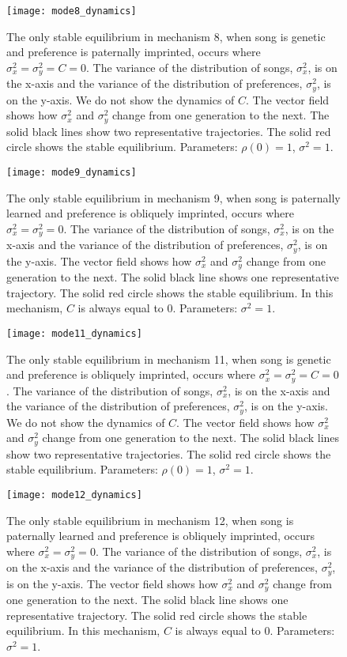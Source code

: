 \documentclass{article}
\begin{document}
\begin{figure}
\texttt{[image: mode8\_dynamics]}
\caption{\label{mode8} The only stable equilibrium in mechanism 8, when song is genetic and preference is paternally imprinted,  occurs where $\sigma_x^2=\sigma_y^2=C=0$. The variance of the distribution of songs, $\sigma_x^2$, is on the x-axis and the variance of the distribution of preferences, $\sigma_y^2$, is on the y-axis. We do not show the dynamics of $C$. The vector field shows how $\sigma_x^2$ and $\sigma_y^2$ change from one generation to the next. The solid black lines show two representative trajectories. The solid red circle shows the stable equilibrium. Parameters: $\rho(0)=1$, $\sigma^2=1$.}
\end{figure}

\begin{figure}
\texttt{[image: mode9\_dynamics]}
\caption{\label{mode9} The only stable equilibrium in mechanism 9, when song is paternally learned and preference is obliquely imprinted,  occurs where $\sigma_x^2=\sigma_y^2=0$. The variance of the distribution of songs, $\sigma_x^2$, is on the x-axis and the variance of the distribution of preferences, $\sigma_y^2$, is on the y-axis. The vector field shows how $\sigma_x^2$ and $\sigma_y^2$ change from one generation to the next. The solid black line shows one representative trajectory. The solid red circle shows the stable equilibrium. In this mechanism, $C$ is always equal to $0$. Parameters: $\sigma^2=1$.}
\end{figure}


\begin{figure}
\texttt{[image: mode11\_dynamics]}
\caption{\label{mode11} The only stable equilibrium in mechanism 11, when song is genetic and preference is obliquely imprinted,  occurs where $\sigma_x^2=\sigma_y^2=C=0$. The variance of the distribution of songs, $\sigma_x^2$, is on the x-axis and the variance of the distribution of preferences, $\sigma_y^2$, is on the y-axis. We do not show the dynamics of $C$. The vector field shows how $\sigma_x^2$ and $\sigma_y^2$ change from one generation to the next. The solid black lines show two representative trajectories. The solid red circle shows the stable equilibrium. Parameters: $\rho(0)=1$, $\sigma^2=1$.}
\end{figure}

\begin{figure}
\texttt{[image: mode12\_dynamics]}
\caption{\label{mode12} The only stable equilibrium in mechanism 12, when song is paternally learned and preference is obliquely imprinted,  occurs where $\sigma_x^2=\sigma_y^2=0$. The variance of the distribution of songs, $\sigma_x^2$, is on the x-axis and the variance of the distribution of preferences, $\sigma_y^2$, is on the y-axis. The vector field shows how $\sigma_x^2$ and $\sigma_y^2$ change from one generation to the next. The solid black line shows one representative trajectory. The solid red circle shows the stable equilibrium. In this mechanism, $C$ is always equal to $0$. Parameters: $\sigma^2=1$.}
\end{figure}
\end{document}
